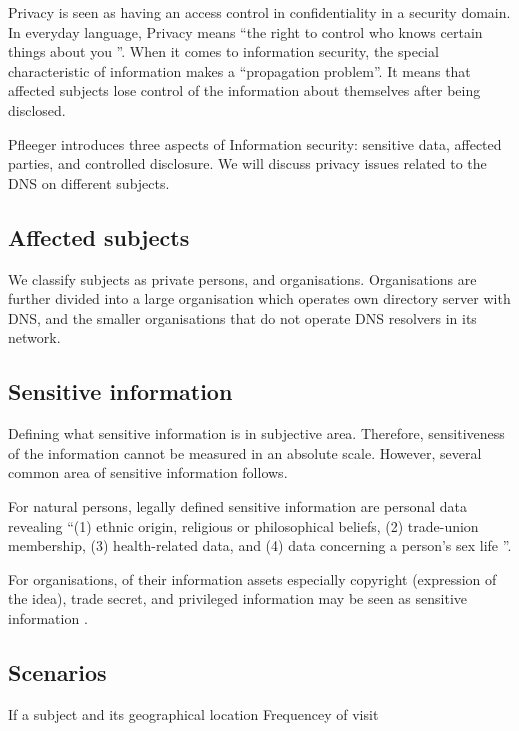 Privacy is seen as having an access control in confidentiality in a security domain.
In everyday language, Privacy means ``the right to control who knows certain things about you \cite{securityincomputing}''.
When it comes to information security, the special characteristic of information makes a ``propagation problem''.
It means that affected subjects lose control of the information about themselves after being disclosed.

Pfleeger introduces three aspects of Information security: sensitive data, affected parties, and controlled disclosure.
We will discuss privacy issues related to the DNS on different subjects.

\subsection{Affected subjects}
We classify subjects as private persons, and organisations. Organisations are further divided into a large organisation which operates own directory server with DNS, and the smaller organisations that do not operate DNS resolvers in its network.

\subsection{Sensitive information}
Defining what sensitive information is in subjective area.
Therefore, sensitiveness of the information cannot be measured in an absolute scale. However, several common area of sensitive information follows.

For natural persons, legally defined sensitive information are personal data revealing ``(1) ethnic origin, religious or philosophical beliefs, (2) trade-union membership, (3) health-related data, and (4) data concerning a person's sex life \cite{GDPR}''.

For organisations, of their information assets especially copyright (expression of the idea), trade secret, and privileged information may be seen as sensitive information \cite{securityincomputing}.

\subsection{Scenarios}
If a subject and its geographical location Frequencey of visit